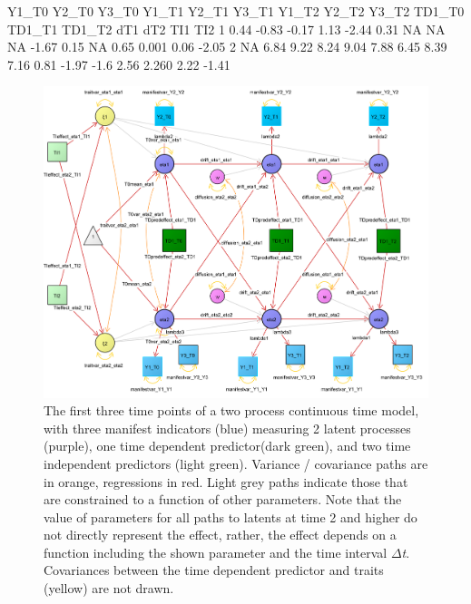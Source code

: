 \documentclass[nojss]{jss}\usepackage[]{graphicx}\usepackage[]{color}
\begin{document}
\begin {scriptsize}
\begin{Schunk}
\begin{Soutput}
  Y1_T0 Y2_T0 Y3_T0 Y1_T1 Y2_T1 Y3_T1 Y1_T2 Y2_T2 Y3_T2 TD1_T0 TD1_T1 TD1_T2  dT1   dT2  TI1   TI2
1  0.44 -0.83 -0.17  1.13 -2.44  0.31    NA    NA    NA  -1.67   0.15     NA 0.65 0.001 0.06 -2.05
2    NA  6.84  9.22  8.24  9.04  7.88  6.45  8.39  7.16   0.81  -1.97   -1.6 2.56 2.260 2.22 -1.41
\end{Soutput}
\end{Schunk}
\end{scriptsize}

\begin{figure}[p]
\includegraphics[width = \textwidth]{pathdiagramtwoprocessfull2}
\caption{ \label{fig:pathdiagramtwoprocessfull} The first three time points of a two process continuous time model, with three manifest indicators (blue) measuring 2 latent processes (purple), one time dependent predictor(dark green), and two time independent predictors (light green). Variance / covariance paths are in orange, regressions in red. Light grey paths indicate those that are constrained to a function of other parameters. Note that the value of parameters for all paths to latents at time 2 and higher do not directly represent the effect, rather, the effect depends on a function including the shown parameter and the time interval $\Delta$\textit{t}. Covariances between the time dependent predictor and traits (yellow) are not drawn.}
\end{figure}
\end{document}
